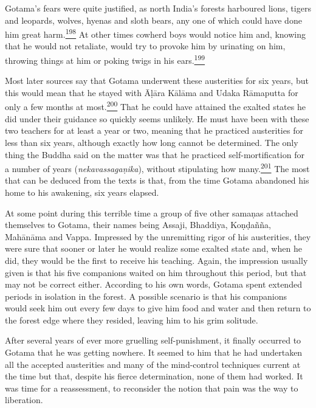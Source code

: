 Gotama's fears were quite justified, as north India's forests harboured
lions, tigers and leopards, wolves, hyenas and sloth bears, any one of
which could have done him great
harm.\label{footprints_split_009.html_fnref198}\hyperref[footprints_split_024.htmlux5cux23fn198]{\textsuperscript{198}}
At other times cowherd boys would notice him and, knowing that he would
not retaliate, would try to provoke him by urinating on him, throwing
things at him or poking twigs in his
ears.\label{footprints_split_009.html_fnref199}\hyperref[footprints_split_024.htmlux5cux23fn199]{\textsuperscript{199}}

Most later sources say that Gotama underwent these austerities for six
years, but this would mean that he stayed with Āḷāra Kālāma and Udaka
Rāmaputta for only a few months at
most.\label{footprints_split_009.html_fnref200}\hyperref[footprints_split_024.htmlux5cux23fn200]{\textsuperscript{200}}
That he could have attained the exalted states he did under their
guidance so quickly seems unlikely. He must have been with these two
teachers for at least a year or two, meaning that he practiced
austerities for less than six years, although exactly how long cannot be
determined. The only thing the Buddha said on the matter was that he
practiced self-mortification for a number of years
(\emph{nekavassagaṇika}), without stipulating how
many.\label{footprints_split_009.html_fnref201}\hyperref[footprints_split_024.htmlux5cux23fn201]{\textsuperscript{201}}
The most that can be deduced from the texts is that, from the time
Gotama abandoned his home to his awakening, six years elapsed.

At some point during this terrible time a group of five other samaṇas
attached themselves to Gotama, their names being Assaji, Bhaddiya,
Koṇḍañña, Mahānāma and Vappa. Impressed by the unremitting rigor of his
austerities, they were sure that sooner or later he would realize some
exalted state and, when he did, they would be the first to receive his
teaching. Again, the impression usually given is that his five
companions waited on him throughout this period, but that may not be
correct either. According to his own words, Gotama spent extended
periods in isolation in the forest. A possible scenario is that his
companions would seek him out every few days to give him food and water
and then return to the forest edge where they resided, leaving him to
his grim solitude.

After several years of ever more gruelling self-punishment, it finally
occurred to Gotama that he was getting nowhere. It seemed to him that he
had undertaken all the accepted austerities and many of the mind-control
techniques current at the time but that, despite his fierce
determination, none of them had worked. It was time for a reassessment,
to reconsider the notion that pain was the way to liberation.

